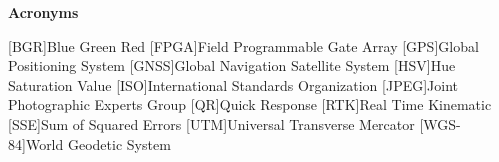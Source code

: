 
\vspace*{0.2cm}
\begin{center}
{\bf \Huge Acronyms}
\end{center}

\begin{acronym}[GNSS] %

[BGR]{Blue Green Red}
[FPGA]{Field Programmable Gate Array}
[GPS]{Global Positioning System}
[GNSS]{Global Navigation Satellite System}
[HSV]{Hue Saturation Value}
[ISO]{International Standards Organization}
[JPEG]{Joint Photographic Experts Group}
[QR]{Quick Response}
[RTK]{Real Time Kinematic}
[SSE]{Sum of Squared Errors}
[UTM]{Universal Transverse Mercator}
[WGS-84]{World Geodetic System}

\end{acronym}




